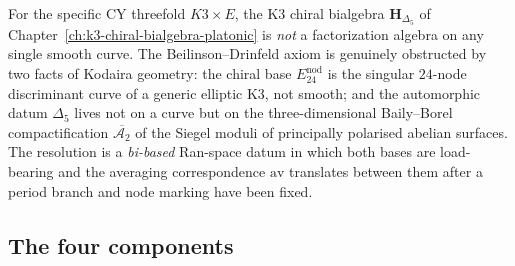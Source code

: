 For the specific CY threefold $K3 \times E$, the K3 chiral bialgebra $\mathbf{H}_{\Delta_5}$ of Chapter~\ref{ch:k3-chiral-bialgebra-platonic} is \emph{not} a factorization algebra on any single smooth curve. The Beilinson--Drinfeld axiom is genuinely obstructed by two facts of Kodaira geometry: the chiral base $E^{\mathrm{nod}}_{24}$ is the singular $24$-node discriminant curve of a generic elliptic K3, not smooth; and the automorphic datum $\Delta_5$ lives not on a curve but on the three-dimensional Baily--Borel compactification $\overline{\mathcal{A}_2}$ of the Siegel moduli of principally polarised abelian surfaces. The resolution is a \emph{bi-based} Ran-space datum in which both bases are load-bearing and the averaging correspondence $\mathrm{av}$ translates between them after a period branch and node marking have been fixed.

\subsection{The four components}

